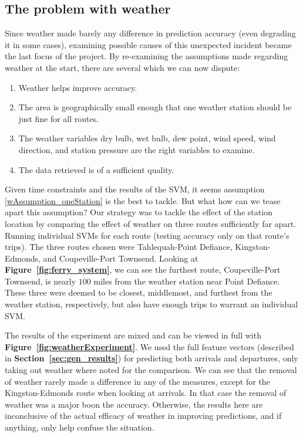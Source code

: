 \documentclass[11pt]{article} %
\begin{document}
\subsection{The problem with weather}
\label{sec:weather_prob}
Since weather made barely any difference in prediction accuracy (even 
degrading it in some cases), examining possible causes of this unexpected 
incident became the last focus of the project. By re-examining the assumptions
made regarding weather at the start, there are several which we can now dispute:

\begin{enumerate}
    \item Weather helps improve accuracy.
    \item \label{wAssumption_oneStation} The area is geographically small enough 
        that one weather station should be just fine for all routes.
    \item The weather variables dry bulb, wet bulb, dew point, wind speed, 
        wind direction, and station pressure are the right variables to examine.
    \item The data retrieved is of a sufficient quality.
\end{enumerate}

Given time constraints and the results of the SVM, it seems assumption 
\ref{wAssumption_oneStation} is the best to tackle. But what how can we tease
apart this assumption? Our strategy was to tackle the effect of the station
location by comparing the effect of weather on three routes sufficiently far apart.
Running individual SVMs for each route (testing accuracy only on that route's 
trips). The three routes chosen were Tahlequah-Point Defiance, Kingston-Edmonds,
and Coupeville-Port Townsend. Looking at \textbf{Figure~\ref{fig:ferry_system}},
we can see the furthest route, Coupeville-Port Townsend, is nearly $100$ miles
from the weather station near Point Defiance. These three were deemed to be 
closest, middlemost, and furthest from the weather station, respectively, but also 
have enough trips to warrant an individual SVM. 

The results of the experiment are mixed and can be viewed in full with 
\textbf{Figure~\ref{fig:weatherExperiment}}. We used the full feature vectors 
(described in \textbf{Section~\ref{sec:gen_results}}) for 
predicting both arrivals and departures, only taking out weather where noted
for the comparison. We can see that the removal of weather rarely made a difference
in any of the measures, except for the Kingston-Edmonds route when looking at 
arrivals. In that case the removal of weather was a major boon the accuracy. 
Otherwise, the results here are inconclusive of the actual efficacy of weather
in improving predictions, and if anything, only help confuse the situation.
\end{document}
